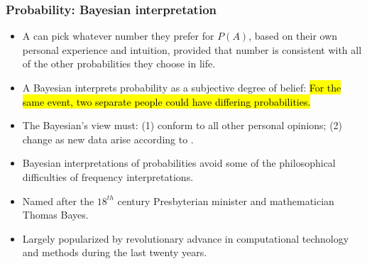 \documentclass[slidestop,compress,mathserif]{beamer}
\begin{document}
\begin{frame}\frametitle{Probability: Bayesian interpretation}
\begin{itemize}
\item A {} can pick whatever number they prefer for $P(A)$, based on their own personal experience and intuition, provided that number is consistent with all of the other probabilities they choose in life.
\pause
\item A Bayesian interprets probability as a subjective degree of belief: \hl{For the same event, two separate people could have differing probabilities.}
\pause %
\item The Bayesian's view must: (1) conform to all other personal opinions; (2) change as new data arise according to .
\pause
\item Bayesian interpretations of probabilities avoid some of the philosophical difficulties of frequency interpretations.
\pause
\item Named after the $18^{th}$ century Presbyterian minister and mathematician Thomas Bayes.
\item Largely popularized by revolutionary advance in computational technology and methods during the last twenty years.
\end{itemize}
\end{frame}


\end{document}
